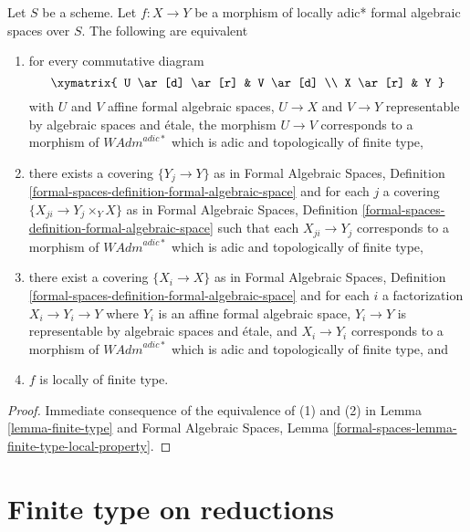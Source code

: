 \begin{lemma}
\label{lemma-finite-type-morphisms}
Let $S$ be a scheme. Let $f : X \to Y$ be a morphism of
locally adic* formal algebraic spaces over $S$.
The following are equivalent
\begin{enumerate}
\item for every commutative diagram
$$
\xymatrix{
U \ar[d] \ar[r] & V \ar[d] \\
X \ar[r] & Y
}
$$
with $U$ and $V$ affine formal algebraic spaces, $U \to X$ and $V \to Y$
representable by algebraic spaces and \'etale, the morphism $U \to V$
corresponds to a morphism of $\textit{WAdm}^{adic*}$ which is
adic and topologically of finite type,
\item there exists a covering $\{Y_j \to Y\}$ as in
Formal Algebraic Spaces,
Definition \ref{formal-spaces-definition-formal-algebraic-space}
and for each $j$
a covering $\{X_{ji} \to Y_j \times_Y X\}$ as in
Formal Algebraic Spaces,
Definition \ref{formal-spaces-definition-formal-algebraic-space}
such that each $X_{ji} \to Y_j$  corresponds
to a morphism of $\textit{WAdm}^{adic*}$ which is adic and
topologically of finite type,
\item there exist a covering $\{X_i \to X\}$ as in
Formal Algebraic Spaces,
Definition \ref{formal-spaces-definition-formal-algebraic-space}
and for each $i$ a factorization $X_i \to Y_i \to Y$ where $Y_i$
is an affine formal algebraic space, $Y_i \to Y$ is representable
by algebraic spaces and \'etale, and $X_i \to Y_i$ corresponds
to a morphism of $\textit{WAdm}^{adic*}$ which is adic and topologically
of finite type, and
\item $f$ is locally of finite type.
\end{enumerate}
\end{lemma}

\begin{proof}
Immediate consequence of the equivalence of (1) and (2) in
Lemma \ref{lemma-finite-type} and
Formal Algebraic Spaces, Lemma
\ref{formal-spaces-lemma-finite-type-local-property}.
\end{proof}










\section{Finite type on reductions}
\label{section-finite-type-red}

